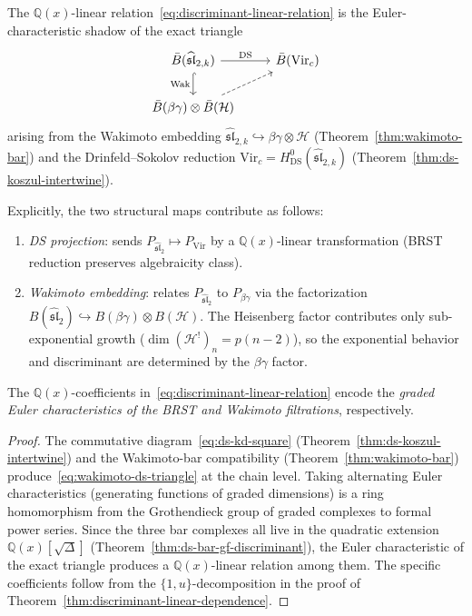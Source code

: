 \begin{proposition}
\label{prop:linear-relation-functorial}
The $\mathbb{Q}(x)$-linear
relation~\textup{\eqref{eq:discriminant-linear-relation}} is the
Euler-characteristic shadow of the exact triangle
\begin{equation}\label{eq:wakimoto-ds-triangle}
\begin{tikzcd}
\bar{B}(\widehat{\mathfrak{sl}}_{2,k})
  \ar[r, "\mathrm{DS}"]
  \ar[d, hook, "\mathrm{Wak}"']
& \bar{B}(\mathrm{Vir}_c) \\
\bar{B}(\beta\gamma) \otimes \bar{B}(\mathcal{H})
  \ar[ur, dashed]
\end{tikzcd}
\end{equation}
arising from the Wakimoto embedding
$\widehat{\mathfrak{sl}}_{2,k} \hookrightarrow
\beta\gamma \otimes \mathcal{H}$
\textup{(}Theorem~\textup{\ref{thm:wakimoto-bar})} and the
Drinfeld--Sokolov reduction
$\mathrm{Vir}_c = H^0_{\mathrm{DS}}(
\widehat{\mathfrak{sl}}_{2,k})$
\textup{(}Theorem~\textup{\ref{thm:ds-koszul-intertwine})}.

Explicitly, the two structural maps contribute as follows:
\begin{enumerate}[label=\textup{(\roman*)}]
\item \emph{DS projection}: sends
  $P_{\widehat{\mathfrak{sl}}_2} \mapsto P_{\mathrm{Vir}}$
  by a $\mathbb{Q}(x)$-linear transformation
  (BRST reduction preserves algebraicity class).
\item \emph{Wakimoto embedding}: relates
  $P_{\widehat{\mathfrak{sl}}_2}$ to
  $P_{\beta\gamma}$ via the factorization
  $B(\widehat{\mathfrak{sl}}_2)
  \hookrightarrow B(\beta\gamma) \otimes B(\mathcal{H})$.
  The Heisenberg factor contributes only sub-exponential growth
  ($\dim (\mathcal{H}^!)_n = p(n{-}2)$), so the exponential
  behavior and discriminant are determined by the
  $\beta\gamma$ factor.
\end{enumerate}
The $\mathbb{Q}(x)$-coefficients in~\textup{\eqref{eq:discriminant-linear-relation}}
encode the \emph{graded Euler characteristics of the BRST and
Wakimoto filtrations}, respectively.
\end{proposition}

\begin{proof}
The commutative diagram~\eqref{eq:ds-kd-square}
(Theorem~\ref{thm:ds-koszul-intertwine}) and the
Wakimoto-bar compatibility
(Theorem~\ref{thm:wakimoto-bar})
produce~\eqref{eq:wakimoto-ds-triangle} at the chain level.
Taking alternating Euler characteristics (generating functions of
graded dimensions) is a ring homomorphism from the Grothendieck
group of graded complexes to formal power series.  Since
the three bar complexes all live in the quadratic extension
$\mathbb{Q}(x)[\sqrt{\Delta}]$
(Theorem~\ref{thm:ds-bar-gf-discriminant}), the Euler
characteristic of the exact triangle produces a
$\mathbb{Q}(x)$-linear relation among them.  The specific
coefficients follow from the $\{1, u\}$-decomposition
in the proof of
Theorem~\ref{thm:discriminant-linear-dependence}.
\end{proof}

